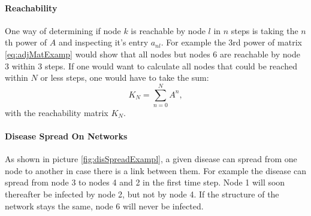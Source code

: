 \paragraph{Reachability}
One way of determining if node $k$ is reachable by node $l$ in $n$ steps is taking the $n$th power of $A$ and inspecting it's entry $a_{nl}$. For example the 3rd power of matrix \ref{eq:adjMatExamp} would show that all nodes but nodes 6 are reachable by node 3 within 3 steps. If one would want to calculate all nodes that could be reached within $N$ or less steps, one would have to take the sum:
\begin{equation}
K_N = \sum_{n=0}^N A^n, \label{eq:reachability}
\end{equation}
with the reachability matrix $K_N$.
\paragraph{Disease Spread On Networks}
As shown in picture \ref{fig:disSpreadExampl}, a given disease can spread from one node to another in case there is a link between them. For example the disease can spread from node 3 to nodes 4 and 2 in the first time step. Node 1 will soon thereafter be infected by node 2, but not by node 4. If the structure of the network stays the same, node 6 will never be infected.
